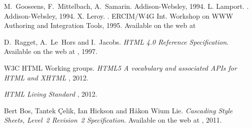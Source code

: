 \begin{thebibliography}{xxxxxxxxxx}
M.~Gooseens, F.~Mittelbach, A.~Samarin.
\newblock Addison-Websley, 1994.
L. Lamport.
.
\newblock Addison-Websley, 1994.
X. Leroy.
.
\newblock ERCIM/W4G Int. Workshop on WWW Authoring and Integration
Tools, 1995.
\newblock Available on the web at

D.~Ragget, A.~Le~Hors and I.~Jacobs.
{\em HTML 4.0 Reference Specification}. Available on the web at
, 1997.

W3C HTML Working groups.
{\em HTML5 A vocabulary and associated APIs for HTML and XHTML}
, 2012.


{\em HTML Living Standard}
,
2012.

Bert Bos,
Tantek \c{C}elik,
Ian Hickson
and
H{\aa}kon Wium Lie.
{\em Cascading Style Sheets, Level~2 Revision~2 Specification}. Available on
the web at
, 2011.
\end{thebibliography}

\printindex
\cutend\cutend

